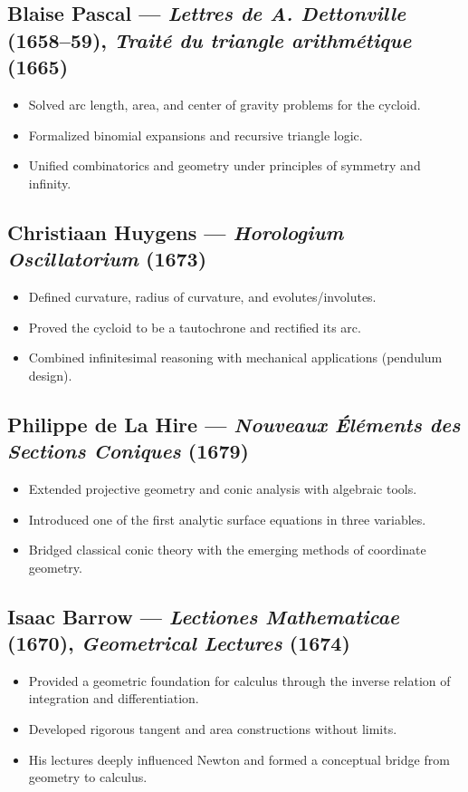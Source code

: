 \documentclass[9pt]{article}
\begin{document}
\subsection*{Blaise Pascal — \textit{Lettres de A. Dettonville} (1658–59), \textit{Traité du triangle arithmétique} (1665)}
\begin{itemize}
  \item Solved arc length, area, and center of gravity problems for the cycloid.
  \item Formalized binomial expansions and recursive triangle logic.
  \item Unified combinatorics and geometry under principles of symmetry and infinity.
\end{itemize}

\subsection*{Christiaan Huygens — \textit{Horologium Oscillatorium} (1673)}
\begin{itemize}
  \item Defined curvature, radius of curvature, and evolutes/involutes.
  \item Proved the cycloid to be a tautochrone and rectified its arc.
  \item Combined infinitesimal reasoning with mechanical applications (pendulum design).
\end{itemize}

\subsection*{Philippe de La Hire — \textit{Nouveaux Éléments des Sections Coniques} (1679)}
\begin{itemize}
  \item Extended projective geometry and conic analysis with algebraic tools.
  \item Introduced one of the first analytic surface equations in three variables.
  \item Bridged classical conic theory with the emerging methods of coordinate geometry.
\end{itemize}

\subsection*{Isaac Barrow — \textit{Lectiones Mathematicae} (1670), \textit{Geometrical Lectures} (1674)}
\begin{itemize}
  \item Provided a geometric foundation for calculus through the inverse relation of integration and differentiation.
  \item Developed rigorous tangent and area constructions without limits.
  \item His lectures deeply influenced Newton and formed a conceptual bridge from geometry to calculus.
\end{itemize}
\end{document}
